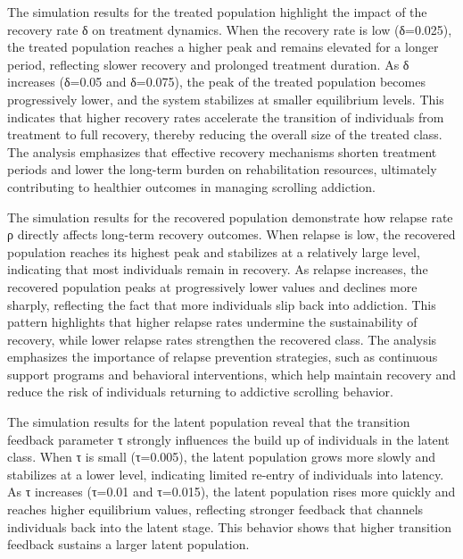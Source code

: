 \documentclass[10pt]{NSP1}
\begin{document}
The simulation results for the treated population highlight the impact of the recovery rate δ on treatment dynamics. When the recovery rate is low (δ=0.025), the treated population reaches a higher peak and remains elevated for a longer period, reflecting slower recovery and prolonged treatment duration. As δ increases (δ=0.05 and δ=0.075), the peak of the treated population becomes progressively lower, and the system stabilizes at smaller equilibrium levels. This indicates that higher recovery rates accelerate the transition of individuals from treatment to full recovery, thereby reducing the overall size of the treated class. The analysis emphasizes that effective recovery mechanisms shorten treatment periods and lower the long-term burden on rehabilitation resources, ultimately contributing to healthier outcomes in managing scrolling addiction.

The simulation results for the recovered population demonstrate how relapse rate ρ directly affects long-term recovery outcomes. When relapse is low, the recovered population reaches its highest peak and stabilizes at a relatively large level, indicating that most individuals remain in recovery. As relapse increases, the recovered population peaks at progressively lower values and declines more sharply, reflecting the fact that more individuals slip back into addiction. This pattern highlights that higher relapse rates undermine the sustainability of recovery, while lower relapse rates strengthen the recovered class. The analysis emphasizes the importance of relapse prevention strategies, such as continuous support programs and behavioral interventions, which help maintain recovery and reduce the risk of individuals returning to addictive scrolling behavior.

The simulation results for the latent population reveal that the transition feedback parameter τ strongly influences the build up of individuals in the latent class. When τ is small (τ=0.005), the latent population grows more slowly and stabilizes at a lower level, indicating limited re-entry of individuals into latency. As τ increases (τ=0.01 and τ=0.015), the latent population rises more quickly and reaches higher equilibrium values, reflecting stronger feedback that channels individuals back into the latent stage. This behavior shows that higher transition feedback sustains a larger latent population.

\par\medskip{}\smallskip
\end{document}
